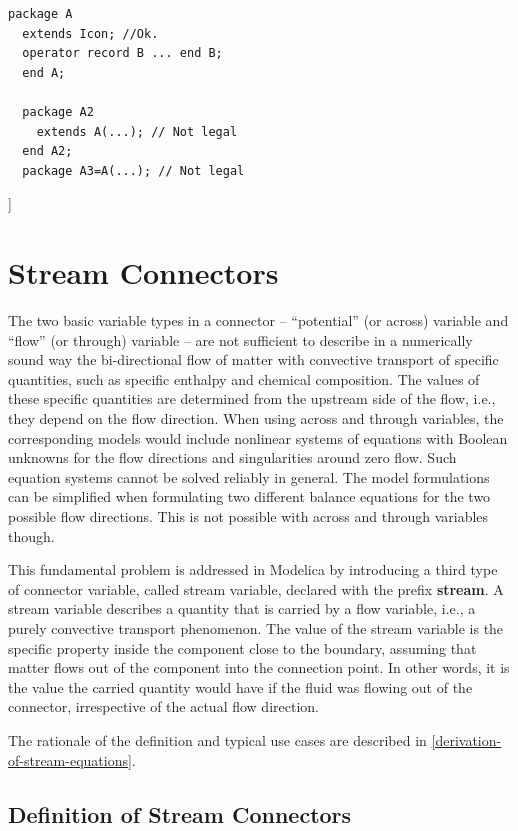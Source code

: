 \documentclass[10pt,a4paper]{report}
\def\doublelabel#1{\label{#1}}
\begin{document}
\begin{lstlisting}[language=modelica]
package A
  extends Icon; //Ok.
  operator record B ... end B;
  end A;

  package A2
    extends A(...); // Not legal
  end A2;
  package A3=A(...); // Not legal
\end{lstlisting}
{]}

\chapter{Stream Connectors}\doublelabel{stream-connectors}

The two basic variable types in a connector -- ``potential'' (or across)
variable and ``flow'' (or through) variable -- are not sufficient to
describe in a numerically sound way the bi-directional flow of matter
with convective transport of specific quantities, such as specific
enthalpy and chemical composition. The values of these specific
quantities are determined from the upstream side of the flow, i.e., they
depend on the flow direction. When using across and through variables,
the corresponding models would include nonlinear systems of equations
with Boolean unknowns for the flow directions and singularities around
zero flow. Such equation systems cannot be solved reliably in general.
The model formulations can be simplified when formulating two different
balance equations for the two possible flow directions. This is not
possible with across and through variables though.

This fundamental problem is addressed in Modelica by introducing a third
type of connector variable, called stream variable, declared with the
prefix \textbf{stream}. A stream variable describes a quantity that is
carried by a flow variable, i.e., a purely convective transport
phenomenon. The value of the stream variable is the specific property
inside the component close to the boundary, assuming that matter flows
out of the component into the connection point. In other words, it is
the value the carried quantity would have if the fluid was flowing out
of the connector, irrespective of the actual flow direction.

The rationale of the definition and typical use cases are described in
\ref{derivation-of-stream-equations}.

\section{Definition of Stream Connectors}\doublelabel{definition-of-stream-connectors}
\end{document}
